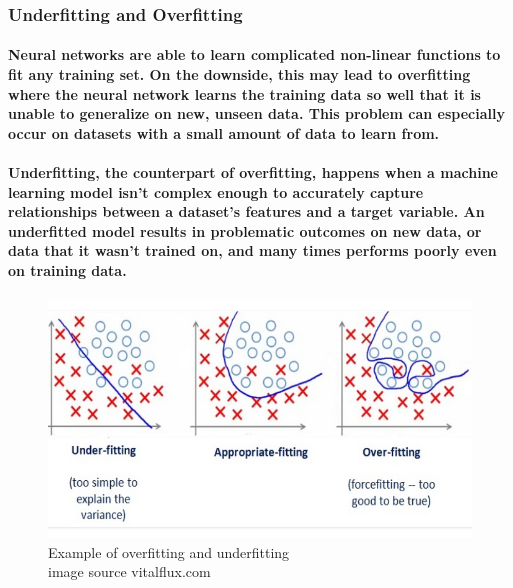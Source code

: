 \clearpage
\subsubsection{Underfitting and Overfitting}
\paragraph{
	Neural networks are able to learn complicated non-linear functions to fit any training set. On the downside, this may lead to overfitting where the neural network learns the training data so well that it is unable to generalize on new, unseen data. This problem can especially occur on datasets with a small amount of data to learn from.
}

\paragraph{
	Underfitting, the counterpart of overfitting, happens when a machine learning model isn’t complex enough to accurately capture relationships between a dataset’s features and a target variable. An underfitted model results in problematic outcomes on new data, or data that it wasn’t trained on, and many times performs poorly even on training data. 
}


\begin{figure}[h]
	\caption[Example of overfitting and underfitting]{Example of overfitting and underfitting
		\\ image source vitalflux.com}
	\centering
	\includegraphics[width=1\textwidth, height=\textheight, keepaspectratio]{"resources/overfitting"}
\end{figure}


